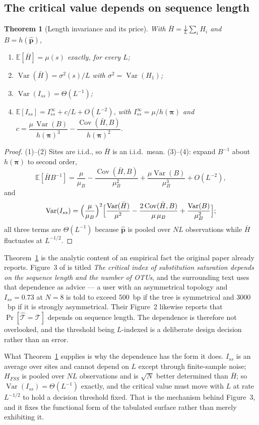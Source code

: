 \documentclass[preprint,12pt,authoryear]{elsarticle}
\newcommand{\Iss}{I_{ss}}
\newcommand{\Hbar}{\bar H}
\newcommand{\HFSS}{H_{FSS}}
\newcommand{\bpi}{\boldsymbol{\pi}}
\newcommand{\E}{\mathbb{E}}
\newcommand{\Var}{\operatorname{Var}}
\newcommand{\Cov}{\operatorname{Cov}}
\newtheorem{theorem}{Theorem}
\theoremstyle{definition}
\theoremstyle{remark}
\begin{document}
\subsection{The critical value depends on sequence length}

\begin{theorem}[Length invariance and its price]
\label{thm:length}
With $\Hbar=\frac1L\sum_iH_i$ and $B=h(\hat{\mathbf p})$,
\begin{enumerate}
\item $\E[\Hbar]=\mu(s)$ exactly, for every $L$;
\item $\Var(\Hbar)=\sigma^2(s)/L$ with $\sigma^2=\Var(H_1)$;
\item $\Var(\Iss)=\Theta(L^{-1})$;
\item $\E[\Iss]=\Iss^\infty+c/L+O(L^{-2})$, with
      $\Iss^\infty=\mu/h(\bpi)$ and
      $c=\dfrac{\mu\,\Var(B)}{h(\bpi)^3}-\dfrac{\Cov(\Hbar,B)}{h(\bpi)^2}$.
\end{enumerate}
\end{theorem}

\begin{proof}
(1)--(2) Sites are i.i.d., so $\Hbar$ is an i.i.d.\ mean. (3)--(4): expand
$B^{-1}$ about $h(\bpi)$ to second order,
\[
  \E[\Hbar B^{-1}]=\frac{\mu}{\mu_B}
  -\frac{\Cov(\Hbar,B)}{\mu_B^2}
  +\frac{\mu\Var(B)}{\mu_B^3}+O(L^{-2}),
\]
and
\[
  \Var(\Iss)=\Bigl(\frac{\mu}{\mu_B}\Bigr)^2
  \Bigl[\frac{\Var(\Hbar)}{\mu^2}
  -\frac{2\Cov(\Hbar,B)}{\mu\,\mu_B}
  +\frac{\Var(B)}{\mu_B^2}\Bigr];
\]
all three terms are $\Theta(L^{-1})$ because $\hat{\mathbf p}$ is pooled over
$NL$ observations while $\Hbar$ fluctuates at $L^{-1/2}$.
\end{proof}

Theorem~\ref{thm:length} is the analytic content of an empirical fact the
original paper already reports. Figure~3 of \citet{xia2003iss} is titled
\emph{The critical index of substitution saturation depends on the sequence
length and the number of OTUs}, and the surrounding text uses that dependence
as advice --- a user with an asymmetrical topology and $\Iss=0.73$ at $N=8$ is
told to exceed $500$~bp if the tree is symmetrical and $3000$~bp if it is
strongly asymmetrical. Their Figure~2 likewise reports that
$\Pr[\hat{\mathcal T}=\mathcal T]$ depends on sequence length. The dependence
is therefore not overlooked, and the threshold being $L$-indexed is a
deliberate design decision rather than an error.

What Theorem~\ref{thm:length} supplies is why the dependence has the form it
does. $\Iss$ is an average over sites and cannot depend on $L$ except through
finite-sample noise; $\HFSS$ is pooled over $NL$ observations and is
$\sqrt N$ better determined than $\Hbar$; so $\Var(\Iss)=\Theta(L^{-1})$
exactly, and the critical value must move with $L$ at rate $L^{-1/2}$ to hold
a decision threshold fixed. That is the mechanism behind Figure~3, and it
fixes the functional form of the tabulated surface rather than merely
exhibiting it.
\end{document}
